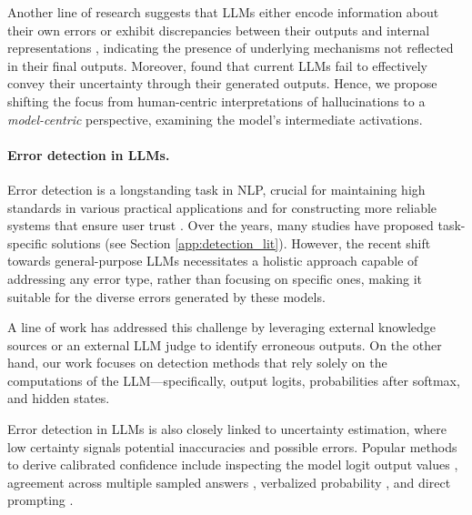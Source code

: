\documentclass{article} %
\begin{document}
Another line of research suggests that LLMs either encode information about their own errors \citep{kadavath2022language, azaria2023internal} or exhibit discrepancies between their outputs and internal representations \citep{liu-etal-2023-cognitive,gottesman2024estimating}, indicating the presence of underlying mechanisms not reflected in their final outputs.
Moreover, \citet{yona2024largelanguagemodelsfaithfully} found that current LLMs fail to effectively convey their uncertainty through their generated outputs.
Hence, we propose shifting the focus from human-centric interpretations of hallucinations to a \textit{model-centric} perspective, examining the model's intermediate activations. 

\paragraph{Error detection in LLMs.}
Error detection is a longstanding task in NLP, crucial for maintaining high standards in various practical applications and for constructing more reliable systems that ensure user trust \citep{bommasani2021opportunities}.
Over the years, many studies have proposed task-specific solutions (see Section \ref{app:detection_lit}).
However, the recent shift towards general-purpose LLMs necessitates a holistic approach capable of addressing any error type, rather than focusing on specific ones, making it suitable for the diverse errors generated by these models.

A line of work has addressed this challenge by leveraging external knowledge sources \citep{lewis2020retrieval, gao2023rarr} or an external LLM judge \citep{lin2021truthfulqa, rawte2023troubling} to identify erroneous outputs.
On the other hand, our work focuses on detection methods that rely solely on the computations of the LLM—specifically, output logits, probabilities after softmax, and hidden states.

Error detection in LLMs is also closely linked to uncertainty estimation, where low certainty signals potential inaccuracies and possible errors.
Popular methods to derive calibrated confidence include inspecting the model logit output values \citep{varshney2023stitch, taubenfeld2025confidence}, agreement across multiple sampled answers \citep{kuhn2023semantic, manakul2023selfcheckgpt, tian2023fine}, verbalized probability \citep{tian2023just}, and direct prompting \citep{kadavath2022language}.
\end{document}
